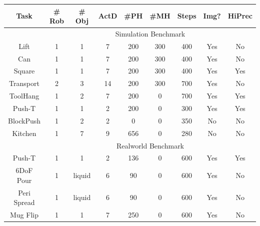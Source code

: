 \setlength\tabcolsep{2 pt}
\small
\begin{tabular}{c|cccccccc}
\toprule
Task      & \# Rob & \# Obj & ActD & \#PH & \#MH & Steps & Img? & HiPrec \\
\midrule
\multicolumn{1}{c}{} & \multicolumn{8}{c}{Simulation Benchmark} \\

\midrule
Lift      & 1      & 1      & 7    & 200   & 300   & 400       & Yes    & No       \\
Can       & 1      & 1      & 7    & 200   & 300   & 400       & Yes    & No       \\
Square    & 1      & 1      & 7    & 200   & 300   & 400       & Yes    & Yes      \\
Transport & 2      & 3      & 14   & 200   & 300   & 700       & Yes    & No       \\
ToolHang  & 1      & 2      & 7    & 200   & 0     & 700       & Yes    & Yes      \\
\midrule
Push-T    & 1      & 1      & 2    & 200   & 0     & 300       & Yes    & Yes      \\
\midrule
BlockPush & 1      & 2      & 2    & 0     & 0     & 350       & No     & No       \\
\midrule
Kitchen   & 1      & 7      & 9    & 656   & 0     & 280       & No     & No      \\
\midrule
\multicolumn{1}{c}{} & \multicolumn{8}{c}{Realworld Benchmark} \\
\midrule
Push-T    & 1      & 1      & 2    & 136   & 0     & 600       & Yes    & Yes  \\
6DoF Pour   & 1    & liquid      & 6    & 90   & 0     & 600       & Yes    & No  \\
Peri Spread   & 1      & liquid      & 6    & 90   & 0     & 600       & Yes    & No  \\
Mug Flip  & 1      & 1      & 7    & 250   & 0     & 600       & Yes    & No  \\
\bottomrule
\end{tabular}
